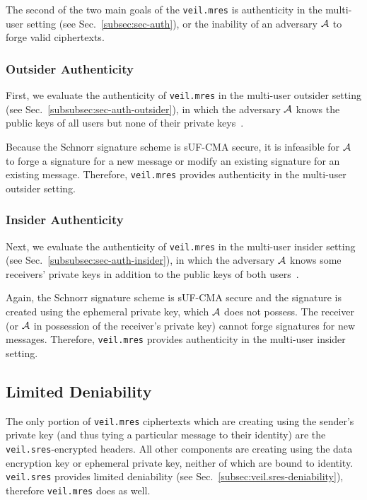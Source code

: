 The second of the two main goals of the \texttt{veil.mres} is authenticity in the multi-user setting
(see Sec.~\ref{subsec:sec-auth}), or the inability of an adversary $\mathcal{A}$ to forge valid ciphertexts.

\subsubsection{Outsider Authenticity}

First, we evaluate the authenticity of \texttt{veil.mres} in the multi-user outsider setting
(see Sec.~\ref{subsubsec:sec-auth-outsider}), in which the adversary $\mathcal{A}$ knows the public keys of all users but
none of their private keys~\cite[p. 47]{baek2010}\@.

Because the Schnorr signature scheme is sUF-CMA secure, it is infeasible for $\mathcal{A}$ to forge a signature for a new
message or modify an existing signature for an existing message.
Therefore, \texttt{veil.mres} provides authenticity in the multi-user outsider setting.

\subsubsection{Insider Authenticity}

Next, we evaluate the authenticity of \texttt{veil.mres} in the multi-user insider setting
(see Sec.~\ref{subsubsec:sec-auth-insider}), in which the adversary $\mathcal{A}$ knows some receivers' private keys in
addition to the public keys of both users~\cite[p. 48]{baek2010}\@.

Again, the Schnorr signature scheme is sUF-CMA secure and the signature is created using the ephemeral private key,
which $\mathcal{A}$ does not possess.
The receiver (or $\mathcal{A}$ in possession of the receiver's private key) cannot forge signatures for new messages.
Therefore, \texttt{veil.mres} provides authenticity in the multi-user insider setting.

\subsection{Limited Deniability}\label{subsec:veil.mres-deniability}

The only portion of \texttt{veil.mres} ciphertexts which are creating using the sender's private key \@(and thus tying
a particular message to their identity) are the \texttt{veil.sres}-encrypted headers.
All other components are creating using the data encryption key or ephemeral private key, neither of which are bound
to identity.
\texttt{veil.sres} provides limited deniability (see Sec.~\ref{subsec:veil.sres-deniability}), therefore
\texttt{veil.mres} does as well.

